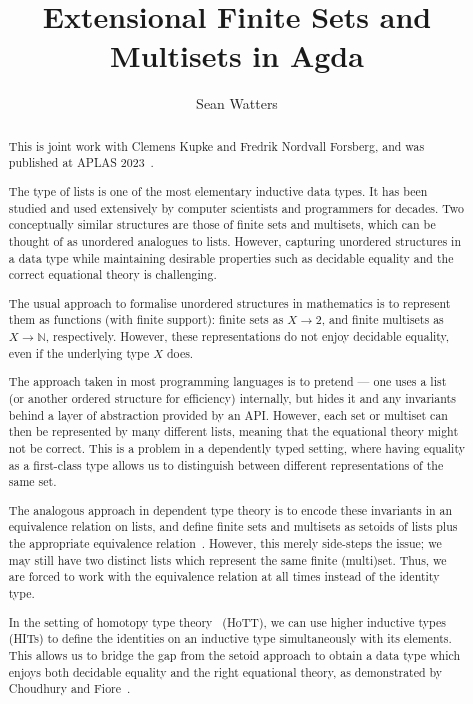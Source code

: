 \documentclass[a4paper]{easychair}
\title{Extensional Finite Sets and Multisets in Agda}
\author{
Sean Watters%
}
\institute{
  University of Strathclyde, UK\\
  \email{sean.watters@strath.ac.uk}
 }
\begin{document}
\maketitle

\begin{abstract}

  This is joint work with Clemens Kupke and Fredrik Nordvall Forsberg,
  and was published at APLAS 2023~\cite{freshlists}.

The type of lists is one of the most elementary inductive data types.
It has been studied and used extensively by computer scientists and programmers for decades.
Two conceptually similar structures are those of finite sets and multisets, which can be thought of as unordered analogues to lists.
However, capturing unordered structures in a data type while maintaining desirable properties such as decidable equality and the correct equational theory is challenging.

The usual approach to formalise unordered structures in mathematics
is to represent them as functions (with finite support): finite sets as $X \to 2$, and finite multisets as $X \to \mathbb{N}$, respectively.
However, these representations do not enjoy decidable equality, even if the underlying type $X$ does.

The approach taken in most programming languages is to pretend --- one uses a list (or another ordered structure for efficiency) internally, but hides it and any invariants behind a layer of abstraction provided by an API.
However, each set or multiset can then be represented by many different lists,
meaning that the equational theory might not be correct. This is a problem
in a dependently typed setting, where
having equality as a first-class type allows us to
distinguish between different representations of the same set.

The analogous approach in dependent type theory is to encode these invariants in an equivalence relation on lists,
and define finite sets and multisets as setoids of lists plus the appropriate equivalence relation~\cite{setoids}.
However, this merely side-steps the issue;
we may still have two distinct lists which represent the same finite (multi)set.
Thus, we are forced to work with the equivalence relation at all times instead of the identity type.

In the setting of homotopy type theory~\cite{hottbook} (HoTT), we can use higher inductive types (HITs) to define the identities on an inductive type simultaneously with its elements.
This allows us to bridge the gap from the setoid approach to obtain a data type which enjoys both decidable equality and the right equational theory, as demonstrated by Choudhury and Fiore~\cite{choudhury2023free}.


\end{abstract}
\end{document}
